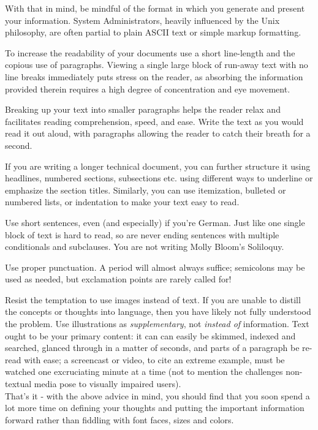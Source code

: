 With that in mind, be mindful of the format in which
you generate and present your information.  System
Administrators, heavily influenced by the Unix
philosophy, are often partial
to plain ASCII text or simple markup formatting.

To increase the readability of your documents use a
short line-length and the copious use of paragraphs.
Viewing a single large block of run-away text with no
line breaks immediately puts stress on the reader, as
absorbing the information provided therein requires a
high degree of concentration and eye movement.

Breaking up your text into smaller paragraphs helps
the reader relax and facilitates reading
comprehension, speed, and ease.  Write the text as you
would read it out aloud, with paragraphs allowing the
reader to catch their breath for a second.

If you are writing a longer technical document, you
can further structure it using headlines, numbered
sections, subsections etc. using different ways to
underline or emphasize the section titles.  Similarly,
you can use itemization, bulleted or numbered lists,
or indentation to make your text easy to read.

Use short sentences, even (and especially) if you're
German.  Just like one single block of text is hard to
read, so are never ending sentences with multiple
conditionals and subclauses.  You are not writing
Molly Bloom's Soliloquy.

Use proper punctuation.  A period will almost always
suffice; semicolons may be used as needed, but
exclamation points are rarely called for!

Resist the temptation to use images instead of text.
If you are unable to distill the concepts or thoughts
into language, then you have likely not fully
understood the problem.  Use illustrations as {\em
supplementary}, not {\em instead of} information.
Text ought to be your primary content: it can can
easily be skimmed, indexed and searched, glanced
through in a matter of seconds, and parts of a
paragraph be re-read with ease; a screencast or video,
to cite an extreme example, must be watched one
excruciating minute at a time (not to mention the
challenges non-textual media pose to visually impaired
users). \\

That's it - with the above advice in mind, you should
find that you soon spend a lot more time on defining
your thoughts and putting the important information
forward rather than fiddling with font faces, sizes
and colors.

